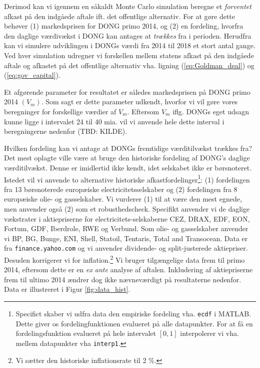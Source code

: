 \documentclass{article}
\begin{document}
Derimod kan vi igennem en såkaldt Monte Carlo simulation beregne et \emph{forventet} afkast på den indgåede aftale ift. det offentlige alternativ. For at gøre dette behøver (1) markedsprisen for DONG primo 2014, og (2) en fordeling, hvorfra den daglige værdivækst i DONG kan antages at \emph{trækkes} fra i perioden. Herudfra kan vi simulere udviklingen i DONGs værdi fra 2014 til 2018 et stort antal gange. Ved hver simulation udregner vi forskellen mellem statens afkast på den indgåede aftale og afkastet på det offentlige alternativ vha. ligning (\ref{eq:Goldman_deal}) og (\ref{eq:gov_capital}).

Et afgørende parameter for resultatet er således markedsprisen på DONG primo 2014 $(V_m)$. Som sagt er dette parameter udkendt, hvorfor vi vil gøre vores beregninger for forskellige værdier af $V_m$. Eftersom $V_m$ iflg. DONGs eget udsagn kunne ligge i intervalet 24 til 40 mia. vil vi anvende hele dette interval i beregningerne nedenfor (TBD: KILDE).

Hvilken fordeling kan vi antage at DONGs fremtidige værditilvækst trækkes fra? Det mest oplagte ville være at bruge den historiske fordeling af DONG's daglige værditilvækst. Denne er imidlertid ikke kendt, idet selskabet ikke er børsnoteret. Istedet vil vi anvende to alternative historiske afkastfordelinger\footnote{Specifict skaber vi udfra data den empiriske fordeling vha. \texttt{ecdf} i MATLAB. Dette giver os fordelingfunktionen evalueret på alle datapunkter. For at få en fordelingsfunktion evalueret på hele intervalet $[0,1]$ interpolerer vi vha. mellem datapunkter vha \texttt{interp1}.}: (1)  fordelingen fra 13 børsnoterede europæiske electricitetsselskaber og (2) fordelingen fra 8 europæiske olie- og gasselskaber. Vi vurderer (1) til at være den mest egnede, men anvender også (2) som et robusthedscheck. Specifikt anvender vi de daglige vækstrater i aktiepriserne for electricitets-selskaberne CEZ, DRAX, EDF, EON, Fortum, GDF, Iberdrole, RWE og Verbund. Som olie- og gasselskaber anvender vi BP, BG, Bunge, ENI, Shell, Statoil, Tentaris, Total and Transocean. Data er fra \texttt{finance.yahoo.com} og vi anvender dividende- og split-justerede aktiepriser. Desuden korrigerer vi for inflation.\footnote{Vi sætter den historiske inflationsrate til 2 \%.} Vi bruger tilgængelige data frem til primo 2014, eftersom dette er en \emph{ex ante} analyse af aftalen. Inkludering af aktiepriserne frem til ultimo 2014 ændrer dog ikke nævneværdigt på resultaterne nedenfor. Data er illustreret i Figur \ref{fig:data_hist}.
\end{document}
